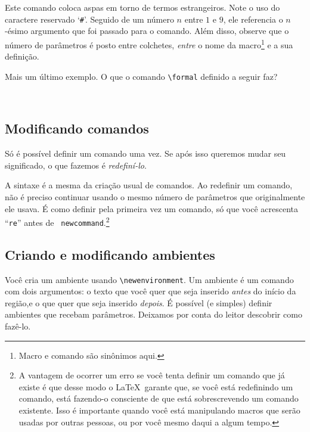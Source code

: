 Este comando coloca aspas em torno de termos estrangeiros. Note o uso
do caractere reservado `{\tt\#}'. Seguido de um número $n$ entre $1$ e
$9$, ele referencia o $n$-ésimo argumento que foi passado para o
comando. Além disso, observe que o número de parâmetros é posto entre
colchetes, \emph{entre} o nome da macro\footnote{Macro e comando são
    sinônimos aqui.} e a sua definição.

Mais um último exemplo. O que o comando \verb'\formal' definido a
seguir faz?

\begin{ttsample}
  \\
\end{ttsample}

\subsection{Modificando comandos}

Só é possível definir um comando uma vez. Se após isso queremos mudar
seu significado, o que fazemos é \emph{redefiní-lo}.
\begin{ttsample}
\end{ttsample}

A sintaxe é a mesma da criação usual de comandos. Ao redefinir um
comando, não é preciso continuar usando o mesmo número de parâmetros
que originalmente ele usava. É como definir pela primeira vez um
comando, só que você acrescenta ``{\tt re}'' antes de {\tt
  newcommand}.\footnote{A vantagem de ocorrer um erro se você tenta
  definir um comando que já existe é que desse modo o \LaTeX\ garante
  que, se você está redefinindo um comando, está fazendo-o consciente
  de que está sobrescrevendo um comando existente. Isso é importante
  quando você está manipulando macros que serão usadas por outras
  pessoas, ou por você mesmo daqui a algum tempo.}

\subsection{Criando e modificando ambientes}

Você cria um ambiente usando \verb'\newenvironment'. Um ambiente é um
comando com dois argumentos: o texto que você quer que seja inserido
\emph{antes} do início da região,e o que quer que seja inserido
\emph{depois}. É possível (e simples) definir ambientes que recebam
parâmetros. Deixamos por conta do leitor descobrir como fazê-lo.


